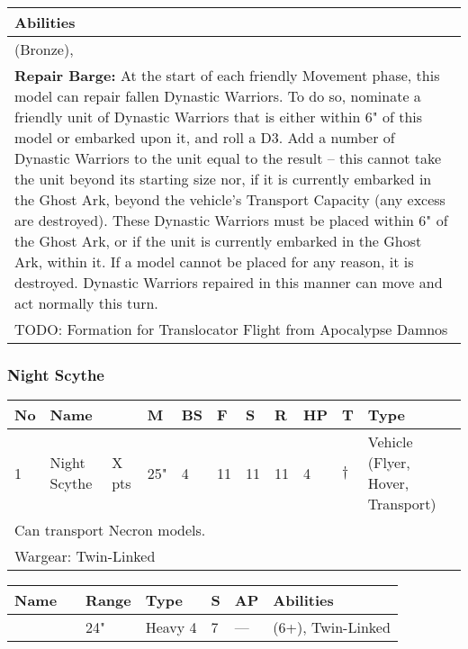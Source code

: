 \noindent
\begin{tabular}{||m{532pt}||}
	\hline
	Abilities \\
	\hline
	\quickref{Awakening Protocols} (Bronze), \quickref{Living Metal}\\
	\textbf{Repair Barge:} At the start of each friendly Movement phase, this model can repair fallen Dynastic Warriors. To do so, nominate a friendly unit of Dynastic Warriors that is either within 6" of this model or embarked upon it, and roll a D3. Add a number of Dynastic Warriors to the unit equal to the result – this cannot take the unit beyond its starting size nor, if it is currently embarked in the Ghost Ark, beyond the vehicle’s Transport Capacity (any excess are destroyed). These Dynastic Warriors must be placed within 6" of the Ghost Ark, or if the unit is currently embarked in the Ghost Ark, within it. If a model cannot be placed for any reason, it is destroyed. Dynastic Warriors repaired in this manner can move and act normally this turn. \\
	TODO: Formation for Translocator Flight from Apocalypse Damnos \\
	\hline
\end{tabular}



\newpage
\subsubsection{Night Scythe}

\noindent
\begin{tabular}{||m{10pt} m{95pt} m{30pt} m{11pt} m{11pt} m{11pt} m{11pt} m{11pt} m{11pt} m{11pt} m{200pt}||}
	\hline
	No & Name & & M & BS & F & S & R & HP & T & Type \\
	\hline
	1 & Night Scythe & X pts & 25" & 4 & 11 & 11 & 11 & 4 & $\dagger$ & Vehicle (Flyer, Hover, Transport) \\
	\hline
	\hline
	\multicolumn{11}{||Z{532 pt}||}{Can transport Necron models.}\\		
	\hline
	\hline
	\multicolumn{11}{||Z{532 pt}||}{Wargear: Twin-Linked \quickref{Tesla Destructor}}\\
	\hline
\end{tabular}

\noindent
\begin{tabular}{||m{110pt} m{30pt} m{31pt} m{55pt} m{12pt} m{12pt} m{210pt}||}
	\hline
	Name & & Range & Type & S & AP & Abilities \\
	\hline
	\quickref{Tesla Destructor} & & 24" & Heavy 4 & 7 & — & \quickref{Tesla} (6+), Twin-Linked\\
	\hline
\end{tabular}


